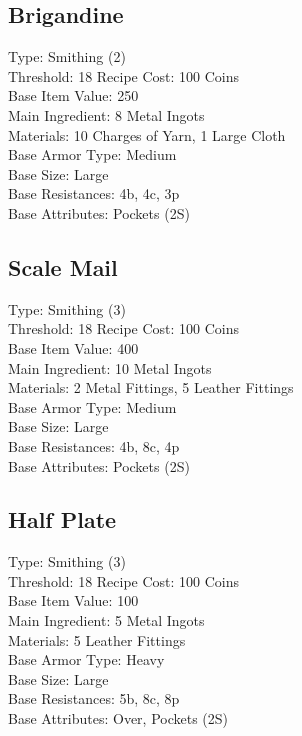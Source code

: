 \subsection{Brigandine}\label{recipe:brigandine}
Type: Smithing (2)\\
Threshold: 18
Recipe Cost: 100 Coins\\
Base Item Value: 250\\
Main Ingredient: 8 Metal Ingots\\
Materials: 10 Charges of Yarn, 1 Large Cloth \\
Base Armor Type: Medium\\
Base Size: Large \\
Base Resistances: 4b, 4c, 3p\\
Base Attributes: Pockets (2S)\\

\subsection{Scale Mail}\label{recipe:scaleMail}
Type: Smithing (3)\\
Threshold: 18
Recipe Cost: 100 Coins\\
Base Item Value: 400\\
Main Ingredient: 10 Metal Ingots\\
Materials: 2 Metal Fittings, 5 Leather Fittings\\
Base Armor Type: Medium\\
Base Size: Large \\
Base Resistances: 4b, 8c, 4p\\
Base Attributes: Pockets (2S)\\

\subsection{Half Plate}\label{recipe:halfPlate}
Type: Smithing (3)\\
Threshold: 18
Recipe Cost: 100 Coins\\
Base Item Value: 100\\
Main Ingredient: 5 Metal Ingots\\
Materials: 5 Leather Fittings\\
Base Armor Type: Heavy\\
Base Size: Large\\
Base Resistances: 5b, 8c, 8p\\
Base Attributes: Over, Pockets (2S)\\

